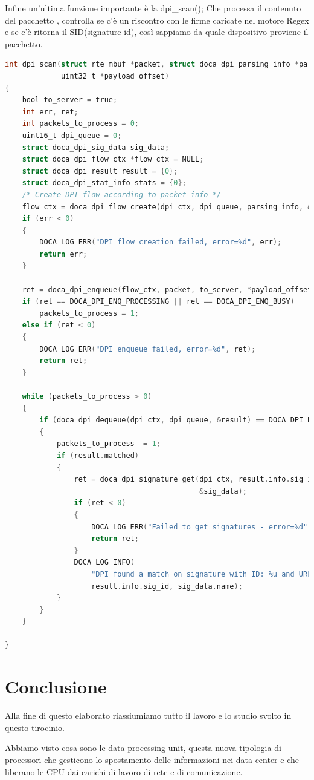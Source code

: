 \documentclass[binding=0.6cm]{sapthesis}
\theoremstyle{definition}
\begin{document}
Infine un'ultima funzione importante è la dpi\_scan();
Che processa il contenuto del pacchetto , controlla se c'è un riscontro con 
le firme caricate nel motore Regex e se c'è ritorna il SID(signature id), così sappiamo
da quale dispositivo proviene il pacchetto.
\newpage


\begin{lstlisting}[title= dpi\_scan();, language=C,firstnumber=236]
int dpi_scan(struct rte_mbuf *packet, struct doca_dpi_parsing_info *parsing_info,
			 uint32_t *payload_offset)
{
	bool to_server = true;
	int err, ret;
	int packets_to_process = 0;
	uint16_t dpi_queue = 0;
	struct doca_dpi_sig_data sig_data;
	struct doca_dpi_flow_ctx *flow_ctx = NULL;
	struct doca_dpi_result result = {0};
	struct doca_dpi_stat_info stats = {0};
	/* Create DPI flow according to packet info */
	flow_ctx = doca_dpi_flow_create(dpi_ctx, dpi_queue, parsing_info, &err, &result);
	if (err < 0)
	{
		DOCA_LOG_ERR("DPI flow creation failed, error=%d", err);
		return err;
	}

	ret = doca_dpi_enqueue(flow_ctx, packet, to_server, *payload_offset, NULL);
	if (ret == DOCA_DPI_ENQ_PROCESSING || ret == DOCA_DPI_ENQ_BUSY)
		packets_to_process = 1;
	else if (ret < 0)
	{
		DOCA_LOG_ERR("DPI enqueue failed, error=%d", ret);
		return ret;
	}

	while (packets_to_process > 0)
	{
		if (doca_dpi_dequeue(dpi_ctx, dpi_queue, &result) == DOCA_DPI_DEQ_READY)
		{
			packets_to_process -= 1;
			if (result.matched)
			{
				ret = doca_dpi_signature_get(dpi_ctx, result.info.sig_id,
											 &sig_data);
				if (ret < 0)
				{
					DOCA_LOG_ERR("Failed to get signatures - error=%d", ret);
					return ret;
				}
				DOCA_LOG_INFO(
					"DPI found a match on signature with ID: %u and URL MSG: %s\n",
					result.info.sig_id, sig_data.name);
			}
		}
	}

}

\end{lstlisting}

\chapter{Conclusione}
Alla fine di questo elaborato riassiumiamo tutto il lavoro e lo studio svolto in questo tirocinio.

Abbiamo visto cosa sono le data processing unit, questa nuova tipologia di processori che 
gesticono lo spostamento delle informazioni nei data center e che liberano le CPU dai carichi
di lavoro di rete e di comunicazione.
\end{document}
